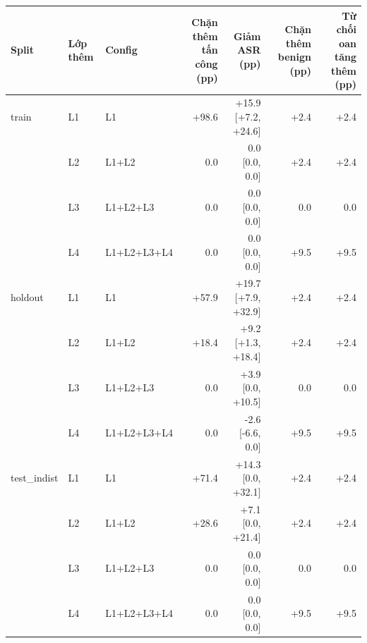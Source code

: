 \begin{tabular}{lllrrrr}
\toprule
Split & Lớp thêm & Config & Chặn thêm tấn công (pp) & Giảm ASR (pp) & Chặn thêm benign (pp) & Từ chối oan tăng thêm (pp) \\
\midrule
train & L1 & L1 & +98.6 & +15.9 [+7.2, +24.6] & +2.4 & +2.4 \\
 & L2 & L1+L2 & 0.0 & 0.0 [0.0, 0.0] & +2.4 & +2.4 \\
 & L3 & L1+L2+L3 & 0.0 & 0.0 [0.0, 0.0] & 0.0 & 0.0 \\
 & L4 & L1+L2+L3+L4 & 0.0 & 0.0 [0.0, 0.0] & +9.5 & +9.5 \\
\midrule
holdout & L1 & L1 & +57.9 & +19.7 [+7.9, +32.9] & +2.4 & +2.4 \\
 & L2 & L1+L2 & +18.4 & +9.2 [+1.3, +18.4] & +2.4 & +2.4 \\
 & L3 & L1+L2+L3 & 0.0 & +3.9 [0.0, +10.5] & 0.0 & 0.0 \\
 & L4 & L1+L2+L3+L4 & 0.0 & -2.6 [-6.6, 0.0] & +9.5 & +9.5 \\
\midrule
test\_indist & L1 & L1 & +71.4 & +14.3 [0.0, +32.1] & +2.4 & +2.4 \\
 & L2 & L1+L2 & +28.6 & +7.1 [0.0, +21.4] & +2.4 & +2.4 \\
 & L3 & L1+L2+L3 & 0.0 & 0.0 [0.0, 0.0] & 0.0 & 0.0 \\
 & L4 & L1+L2+L3+L4 & 0.0 & 0.0 [0.0, 0.0] & +9.5 & +9.5 \\
\bottomrule
\end{tabular}
